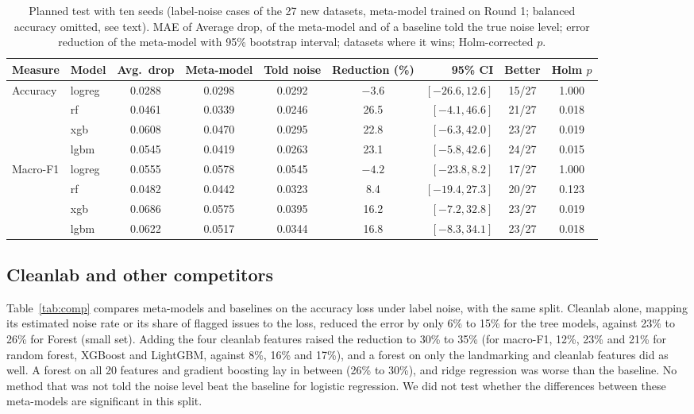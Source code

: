 \documentclass[conference]{IEEEtran}
\begin{document}
\begin{table}[!t]
\centering
\caption{Planned test with ten seeds (label-noise cases of the 27 new datasets, meta-model trained on Round 1; balanced accuracy omitted, see text). MAE of Average drop, of the meta-model and of a baseline told the true noise level; error reduction of the meta-model with 95\% bootstrap interval; datasets where it wins; Holm-corrected $p$.}
\label{tab:ext}
\footnotesize
\setlength{\tabcolsep}{4pt}
\begin{tabular}{@{}llccccrcc@{}}
\toprule
Measure & Model & Avg.\ drop & Meta-model & Told noise & Reduction (\%) & 95\% CI & Better & Holm $p$ \\
\midrule
Accuracy & logreg & 0.0288 & 0.0298 & 0.0292 & $-3.6$ & $[-26.6, 12.6]$ & 15/27 & 1.000 \\
 & rf & 0.0461 & 0.0339 & 0.0246 & 26.5 & $[-4.1, 46.6]$ & 21/27 & 0.018 \\
 & xgb & 0.0608 & 0.0470 & 0.0295 & 22.8 & $[-6.3, 42.0]$ & 23/27 & 0.019 \\
 & lgbm & 0.0545 & 0.0419 & 0.0263 & 23.1 & $[-5.8, 42.6]$ & 24/27 & 0.015 \\
\midrule
Macro-F1 & logreg & 0.0555 & 0.0578 & 0.0545 & $-4.2$ & $[-23.8, 8.2]$ & 17/27 & 1.000 \\
 & rf & 0.0482 & 0.0442 & 0.0323 & 8.4 & $[-19.4, 27.3]$ & 20/27 & 0.123 \\
 & xgb & 0.0686 & 0.0575 & 0.0395 & 16.2 & $[-7.2, 32.8]$ & 23/27 & 0.019 \\
 & lgbm & 0.0622 & 0.0517 & 0.0344 & 16.8 & $[-8.3, 34.1]$ & 23/27 & 0.018 \\
\bottomrule
\end{tabular}
\end{table}

\subsection{Cleanlab and other competitors}
Table~\ref{tab:comp} compares meta-models and baselines on the accuracy loss under label noise, with the same split. Cleanlab alone, mapping its estimated noise rate or its share of flagged issues to the loss, reduced the error by only 6\% to 15\% for the tree models, against 23\% to 26\% for Forest (small set). Adding the four cleanlab features raised the reduction to 30\% to 35\% (for macro-F1, 12\%, 23\% and 21\% for random forest, XGBoost and LightGBM, against 8\%, 16\% and 17\%), and a forest on only the landmarking and cleanlab features did as well. A forest on all 20 features and gradient boosting lay in between (26\% to 30\%), and ridge regression was worse than the baseline. No method that was not told the noise level beat the baseline for logistic regression. We did not test whether the differences between these meta-models are significant in this split.
\end{document}
